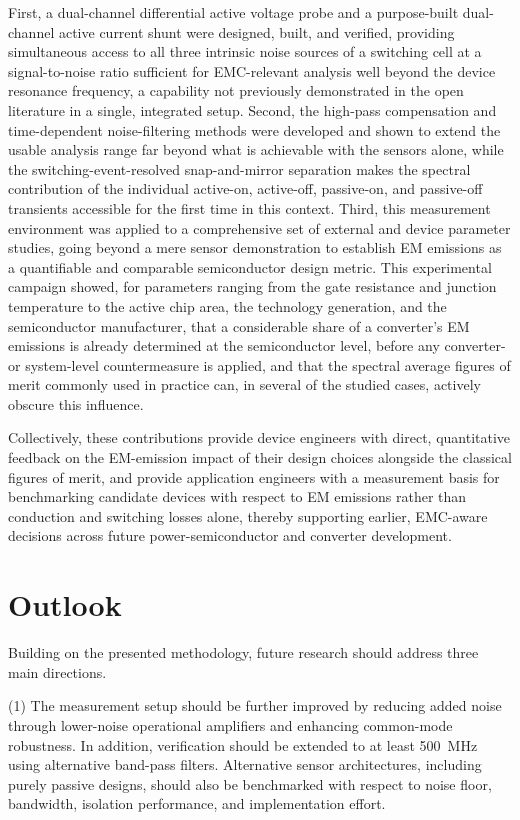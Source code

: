 First, a dual-channel differential active voltage probe and a purpose-built dual-channel active current shunt were designed, built, and verified, providing simultaneous access to all three intrinsic noise sources of a switching cell at a signal-to-noise ratio sufficient for EMC-relevant analysis well beyond the device resonance frequency, a capability not previously demonstrated in the open literature in a single, integrated setup.
Second, the high-pass compensation and time-dependent noise-filtering methods were developed and shown to extend the usable analysis range far beyond what is achievable with the sensors alone, while the switching-event-resolved snap-and-mirror separation makes the spectral contribution of the individual active-on, active-off, passive-on, and passive-off transients accessible for the first time in this context.
Third, this measurement environment was applied to a comprehensive set of external and device parameter studies, going beyond a mere sensor demonstration to establish EM emissions as a quantifiable and comparable semiconductor design metric.
This experimental campaign showed, for parameters ranging from the gate resistance and junction temperature to the active chip area, the technology generation, and the semiconductor manufacturer, that a considerable share of a converter's EM emissions is already determined at the semiconductor level, before any converter- or system-level countermeasure is applied, and that the spectral average figures of merit commonly used in practice can, in several of the studied cases, actively obscure this influence.

Collectively, these contributions provide device engineers with direct, quantitative feedback on the EM-emission impact of their design choices alongside the classical figures of merit, and provide application engineers with a measurement basis for benchmarking candidate devices with respect to EM emissions rather than conduction and switching losses alone, thereby supporting earlier, EMC-aware decisions across future power-semiconductor and converter development.

\section*{Outlook}

Building on the presented methodology, future research should address three main directions.

(1) The measurement setup should be further improved by reducing added noise through lower-noise operational amplifiers and enhancing common-mode robustness.
In addition, verification should be extended to at least \SI{500}{MHz} using alternative band-pass filters.
Alternative sensor architectures, including purely passive designs, should also be benchmarked with respect to noise floor, bandwidth, isolation performance, and implementation effort.

